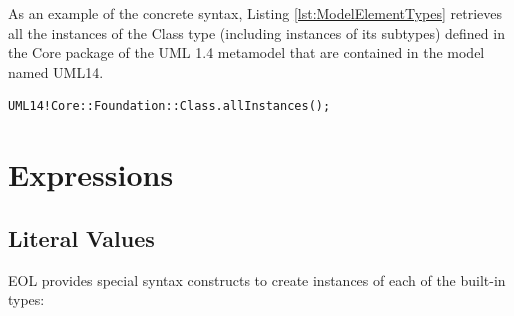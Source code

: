 As an example of the concrete syntax, Listing \ref{lst:ModelElementTypes} retrieves all the instances of the Class type (including instances of its subtypes) defined in the Core package of the UML 1.4 metamodel that are contained in the model named UML14.

\begin{lstlisting}[float=h, caption=Demonstration of the concrete syntax for accessing model element types, label=lst:ModelElementTypes, language=EOL]
UML14!Core::Foundation::Class.allInstances();
\end{lstlisting}

\section{Expressions}

\subsection{Literal Values}

EOL provides special syntax constructs to create instances of each of the built-in types:

